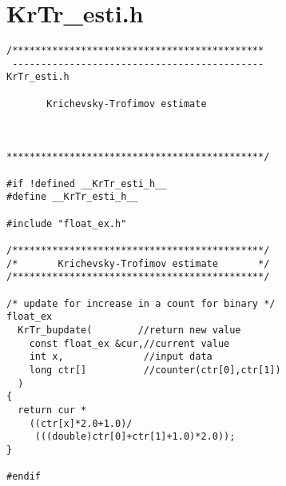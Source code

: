 \section{KrTr\_esti.h}
\begin{verbatim}
/********************************************
 --------------------------------------------
KrTr_esti.h

       Krichevsky-Trofimov estimate



*********************************************/

#if !defined __KrTr_esti_h__
#define __KrTr_esti_h__

#include "float_ex.h"

/********************************************/
/*       Krichevsky-Trofimov estimate       */
/********************************************/

/* update for increase in a count for binary */
float_ex
  KrTr_bupdate(        //return new value
    const float_ex &cur,//current value
    int x,              //input data
    long ctr[]          //counter(ctr[0],ctr[1])
  )
{
  return cur *
    ((ctr[x]*2.0+1.0)/
     (((double)ctr[0]+ctr[1]+1.0)*2.0));
}

#endif
\end{verbatim}
